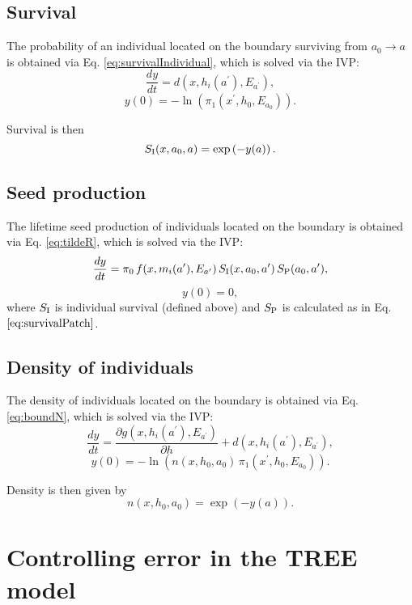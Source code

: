 \documentclass[10pt,twoside]{article}
\begin{document}
\subsection{Survival}\label{survival}

The probability of an individual located on the boundary surviving from
\(a_0 \rightarrow a\) is obtained via Eq. \ref{eq:survivalIndividual},
which is solved via the IVP:
\[\frac{dy}{dt} = d(x,h_i(a^\prime), E_{a^\prime}),\]
\[ y(0) = - \ln\left(\pi_1 (x^\prime,h_0, E_{a_0})\right) .\]

Survival is then \[ S_{\rm I} (x, a_0, a) = \exp\left(- y(a) \right).\]

\subsection{Seed production}\label{seed-production}

The lifetime seed production of individuals located on the boundary is
obtained via Eq. \ref{eq:tildeR}, which is solved via the IVP:
\[\frac{dy}{dt} = \pi_0 \,f(x, m_i(a^\prime), E_{a^\prime}) \, S_{\rm I} (x, a_0, a^\prime) \, S_{\rm P} (a_0,a^\prime),\]
\[ y(0) = 0,\] where \(S_{\rm I}\) is individual survival (defined
above) and \(S_{\rm P}\) is calculated as in Eq.
\(\ref{eq:survivalPatch}\).

\subsection{Density of individuals}\label{density-of-individuals}

The density of individuals located on the boundary is obtained via Eq.
\ref{eq:boundN}, which is solved via the IVP:
\[\frac{dy}{dt} = \frac{\partial g(x,h_i(a^\prime), E_{a^\prime})}{\partial h} +d(x,h_i(a^\prime),E_{a^\prime}),\]
\[ y(0) = -\ln\left(n(x,h_0 ,a_0) \, \pi_1 (x^\prime,h_0, E_{a_0}) \right).\]

Density is then given by \[n(x,h_0 ,a_0) =\exp(-y(a)).\]

\section{Controlling error in the TREE
model}\label{controlling-error-in-the-tree-model}
\end{document}
